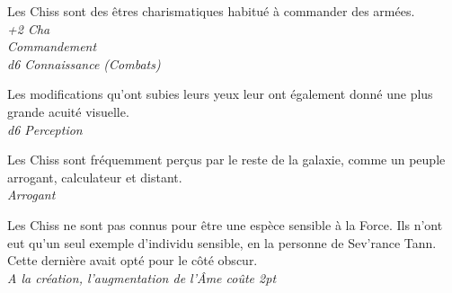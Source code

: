 \begin{description}[align=left]
\item [Charismatique] 			%
		Les Chiss sont des êtres charismatiques habitué à commander des armées.\\
		\textit{+2 Cha}\\
		\textit{Commandement}\\
		\textit{d6 Connaissance (Combats)}

\item [Acuité visuelle] 		%
		Les modifications qu’ont subies leurs yeux leur ont également donné une plus grande acuité visuelle.\\
		\textit{d6 Perception}

\item [Arrogant] 				%
		Les Chiss sont fréquemment perçus par le reste de la galaxie, comme un peuple arrogant, calculateur et distant.\\
		\textit{Arrogant}
		
\item [Insensible à la Force] 		%
		Les Chiss ne sont pas connus pour être une espèce sensible à la Force. Ils n’ont eut qu’un seul exemple d’individu sensible, en la personne de Sev’rance Tann. Cette dernière avait opté pour le côté obscur.\\
		\textit{A la création, l’augmentation de l’\^Ame coûte 2pt}
\end{description}

